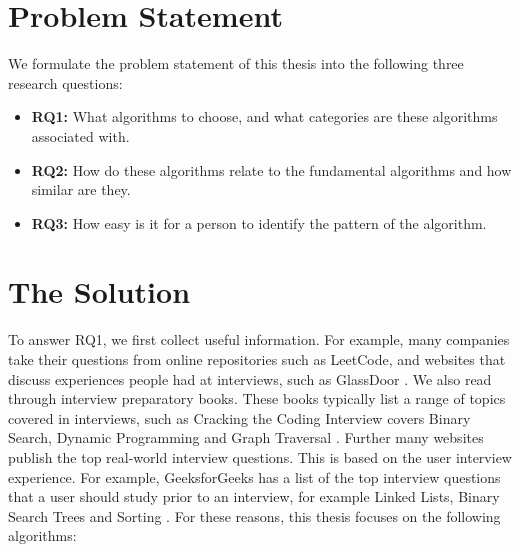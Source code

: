 \documentclass[conference]{IEEEtran}
\begin{document}
\section{Problem Statement}
\label{label:problemstmt}
We formulate the problem statement of this thesis into the following three research questions:
\begin{itemize}
\item \textbf{RQ1: }What algorithms to choose, and what categories are these algorithms associated with. 
\item \textbf{RQ2: }How do these algorithms relate to the fundamental algorithms and how similar are they.
\item \textbf{RQ3: }How easy is it for a person to identify the pattern of the algorithm.
\end{itemize}

\section{The Solution}
To answer RQ1, we first collect useful information. For example, many companies take their questions from online repositories such as LeetCode, and websites that discuss experiences people had at interviews, such as GlassDoor \cite{glassdoor}. We also read through interview preparatory books. These books typically list a range of topics covered in interviews, such as Cracking the Coding Interview covers Binary Search, Dynamic Programming and Graph Traversal \cite{mcdowell2015cracking}. Further many websites publish the top real-world interview questions. This is based on the user interview experience. For example, GeeksforGeeks has a list of the top interview questions that a user should study prior to an interview, for example Linked Lists, Binary Search Trees and Sorting \cite{geeksalgos}. For these reasons, this thesis focuses on the following algorithms:
\end{document}
